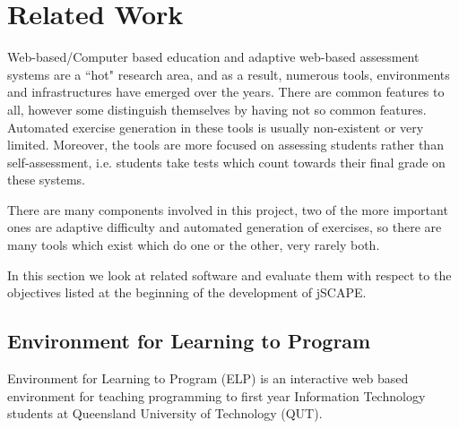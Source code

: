 \chapter{Related Work}
\label{chap:related-work}




Web-based/Computer based education and adaptive web-based assessment systems are a ``hot" research area, and as a result, numerous tools, environments and infrastructures have emerged over the years. There are common features to all, however some distinguish themselves by having not so common features.
Automated exercise generation in these tools is usually non-existent or very limited. Moreover, the tools are more focused on assessing students rather than self-assessment, i.e. students take tests which count towards their final grade on these systems.\newline

There are many components involved in this project, two of the more important ones are adaptive difficulty and automated generation of exercises, so there are many tools which exist which do one or the other, very rarely both.\newline

In this section we look at related software and evaluate them with respect to the objectives listed at the beginning of the development of jSCAPE.

\section{Environment for Learning to Program}
Environment for Learning to Program (ELP) is an interactive web based environment for teaching programming to first year Information Technology students at Queensland University of Technology (QUT).

